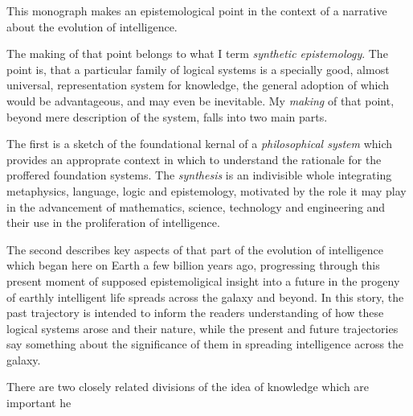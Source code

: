 
This monograph makes an epistemological point in the context of a narrative about the evolution of intelligence.

The making of that point belongs to what I term \emph{synthetic epistemology}.
The point is, that a particular family of logical systems is a specially good, almost universal, representation system for knowledge, the general adoption of which would be advantageous, and may even be inevitable.
My \emph{making} of that point, beyond mere description of the system, falls into two main parts.

The first is a sketch of the foundational kernal of a \emph{philosophical system} which provides an approprate context in which to understand the rationale for the proffered foundation systems.
The \emph{synthesis} is an indivisible whole integrating metaphysics, language, logic and epistemology, motivated by the role it may play in the advancement of mathematics, science, technology and engineering and their use in the proliferation of intelligence. 

The second describes key aspects of that part of the evolution of intelligence which began here on Earth a few billion years ago, progressing through this present moment of supposed epistemoligical insight into a future in the progeny of earthly intelligent life spreads across the galaxy and beyond.
In this story, the past trajectory is intended to inform the readers understanding of how these logical systems arose and their nature, while the present and future trajectories say something about the significance of them in spreading intelligence across the galaxy.

There are two closely related divisions of the idea of knowledge which are important he